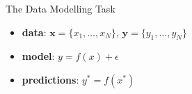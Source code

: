 \documentclass[pdf]{beamer}
\begin{document}
\begin{frame}{The Data Modelling Task}
\begin{itemize}\addtolength{\itemsep}{1\baselineskip}
	\item \textbf{data}: $\mathbf{x} = \{x_1,\ldots, x_N\}$, $\mathbf{y} = \{y_1,\ldots, y_N\}$
	\item \textbf{model}: $y = f(x) + \epsilon$\\
	\item \textbf{predictions}: $y^* = f(x^*)$
\end{itemize}
\begin{center}
\end{center}
\end{frame}
\end{document}

